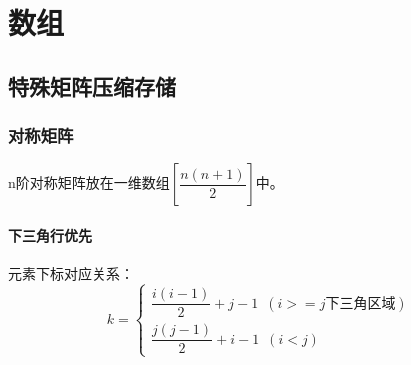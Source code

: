 
\chapter{数组}

\section{特殊矩阵压缩存储}

\subsection{对称矩阵}
n阶对称矩阵放在一维数组\([\dfrac{n(n + 1)}{2}]\)中。

\subsubsection{下三角行优先}
元素下标对应关系：
\[k = \begin{cases}
    \dfrac{i(i - 1)}{2} + j - 1\,\,\,(i >= j\text{下三角区域}) \\
    \dfrac{j(j - 1)}{2} + i - 1\,\,\,(i < j)
\end{cases}\]


